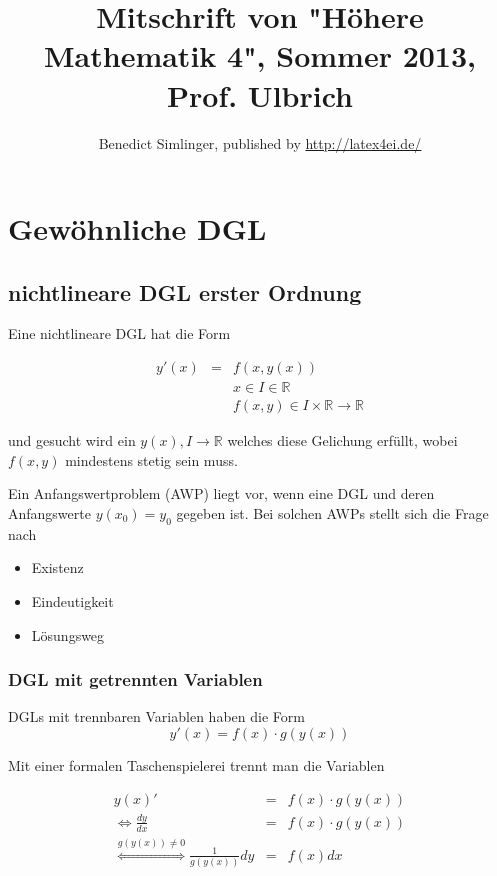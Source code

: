 \documentclass[10pt,a4paper]{article}
\author{Benedict Simlinger, published by \url{http://latex4ei.de/}}
\title{Mitschrift von "Höhere Mathematik 4", Sommer 2013, Prof. Ulbrich}
\begin{document}
\maketitle
\tableofcontents
\newpage



\section{Gewöhnliche DGL}


\subsection{nichtlineare DGL erster Ordnung}

Eine nichtlineare DGL hat die Form 

\begin{eqnarray}
y'(x)&=& f(x, y(x)) \\
&&x \in I \in \mathbb{R} \nonumber \\
&&f(x,y) \in I \times \mathbb{R} \rightarrow \mathbb{R} \nonumber
\end{eqnarray}

 und gesucht wird ein $y(x), I \rightarrow \mathbb{R}$ welches diese Gelichung erfüllt, wobei $f(x,y)$ mindestens stetig sein muss.

Ein Anfangswertproblem (AWP) liegt vor, wenn eine DGL und deren Anfangswerte $y(x_0)=y_0$ gegeben ist. Bei solchen AWPs stellt sich die Frage nach
\begin{itemize}
\item Existenz
\item Eindeutigkeit
\item Lösungsweg
\end{itemize}

\subsubsection{DGL mit getrennten Variablen}
DGLs mit trennbaren Variablen haben die Form 
\begin{equation}
y'(x)=f(x) \cdot g(y(x))
\end{equation}

Mit einer formalen Taschenspielerei trennt man die Variablen


\begin{eqnarray*}
					y(x)'					&=&f(x) \cdot g(y(x)) \\
\Leftrightarrow		\frac{dy}{dx}			&=&f(x) \cdot g(y(x)) \\
\stackrel{g(y(x)) \not= 0}{\Leftrightarrow	}	\frac{1}{g(y(x))}dy	&=&f(x)dx
\end{eqnarray*}
\end{document}
